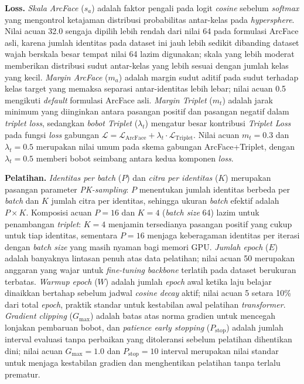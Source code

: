 \textbf{Loss.} \textit{Skala ArcFace} ($s_a$) adalah faktor pengali pada logit \textit{cosine} sebelum \textit{softmax} yang mengontrol ketajaman distribusi probabilitas antar-kelas pada \textit{hypersphere}. Nilai acuan 32.0 sengaja dipilih lebih rendah dari nilai 64 pada formulasi ArcFace asli, karena jumlah identitas pada dataset ini jauh lebih sedikit dibanding dataset wajah berskala besar tempat nilai 64 lazim digunakan; skala yang lebih moderat memberikan distribusi sudut antar-kelas yang lebih sesuai dengan jumlah kelas yang kecil. \textit{Margin ArcFace} ($m_a$) adalah margin sudut aditif pada sudut terhadap kelas target yang memaksa separasi antar-identitas lebih lebar; nilai acuan 0.5 mengikuti \textit{default} formulasi ArcFace asli. \textit{Margin Triplet} ($m_t$) adalah jarak minimum yang diinginkan antara pasangan positif dan pasangan negatif dalam \textit{triplet loss}, sedangkan \textit{bobot Triplet} ($\lambda_t$) mengatur besar kontribusi \textit{Triplet Loss} pada fungsi \textit{loss} gabungan $\mathcal{L} = \mathcal{L}_{\text{ArcFace}} + \lambda_t \cdot \mathcal{L}_{\text{Triplet}}$. Nilai acuan $m_t=0{.}3$ dan $\lambda_t=0{.}5$ merupakan nilai umum pada skema gabungan ArcFace+Triplet, dengan $\lambda_t=0{.}5$ memberi bobot seimbang antara kedua komponen \textit{loss}.

\textbf{Pelatihan.} \textit{Identitas per batch} ($P$) dan \textit{citra per identitas} ($K$) merupakan pasangan parameter \textit{PK-sampling}: $P$ menentukan jumlah identitas berbeda per \textit{batch} dan $K$ jumlah citra per identitas, sehingga ukuran \textit{batch} efektif adalah $P \times K$. Komposisi acuan $P=16$ dan $K=4$ (\textit{batch size} 64) lazim untuk penambangan \textit{triplet}: $K=4$ menjamin tersedianya pasangan positif yang cukup untuk tiap identitas, sementara $P=16$ menjaga keberagaman identitas per iterasi dengan \textit{batch size} yang masih nyaman bagi memori GPU. \textit{Jumlah epoch} ($E$) adalah banyaknya lintasan penuh atas data pelatihan; nilai acuan 50 merupakan anggaran yang wajar untuk \textit{fine-tuning} \textit{backbone} terlatih pada dataset berukuran terbatas. \textit{Warmup epoch} ($W$) adalah jumlah \textit{epoch} awal ketika laju belajar dinaikkan bertahap sebelum jadwal \textit{cosine decay} aktif; nilai acuan 5 setara 10\% dari total \textit{epoch}, praktik standar untuk kestabilan awal pelatihan \textit{transformer}. \textit{Gradient clipping} ($G_{\max}$) adalah batas atas norma gradien untuk mencegah lonjakan pembaruan bobot, dan \textit{patience early stopping} ($P_{\text{stop}}$) adalah jumlah interval evaluasi tanpa perbaikan yang ditoleransi sebelum pelatihan dihentikan dini; nilai acuan $G_{\max}=1{.}0$ dan $P_{\text{stop}}=10$ interval merupakan nilai standar untuk menjaga kestabilan gradien dan menghentikan pelatihan tanpa terlalu prematur.

